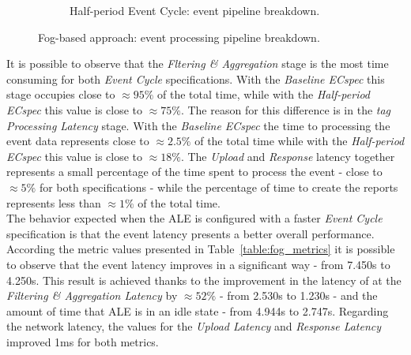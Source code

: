 \begin{figure}[ht!]
\begin{subfigure}{.5\textwidth}
    \caption{Half-period Event Cycle: event pipeline breakdown.}
    \label{fig:ecspec_effective_half}
  \end{subfigure}
  \caption[Fog-based approach: event processing breakdown.]{Fog-based approach: event processing pipeline breakdown.}
  \label{fig:ecspec_effective_breakdown}
\end{figure}

It is possible to observe that the \textit{Fltering \& Aggregation} stage is the most time consuming
for both \textit{Event Cycle} specifications. With the \textit{Baseline ECspec} this stage occupies
close to $\approx95\%$ of the total time, while with the \textit{Half-period ECspec} this value is
close to $\approx75\%$. The reason for this difference is in the \textit{tag Processing Latency} stage.
With the \textit{Baseline ECspec} the time to processing the event data represents close to $\approx2.5\%$
of the total time while with the \textit{Half-period ECspec} this value is close to $\approx18\%$.
The \textit{Upload} and \textit{Response} latency together represents a small percentage of
the time spent to process the event - close to $\approx5\%$ for both specifications - while the percentage
of time to create the reports represents less than $\approx1\%$ of the total time.\\

The behavior expected when the \gls{ALE} is configured with a faster \textit{Event Cycle} specification
is that the event latency presents a better overall performance. According the metric values presented in
Table~\ref{table:fog_metrics} it is possible to observe that the event latency improves in a significant
way - from 7.450s to 4.250s. This result is achieved thanks to the improvement in the latency
of at the \textit{Filtering \& Aggregation Latency} by $\approx52\%$ - from 2.530s to 1.230s - and the
amount of time that \gls{ALE} is in an idle state - from 4.944s to 2.747s. Regarding the network
latency, the values for the \textit{Upload Latency} and \textit{Response Latency} improved 1ms for both
metrics.\\

